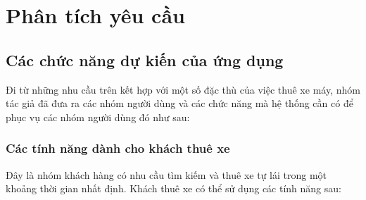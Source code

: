 \documentclass[../main.tex]{subfiles}
\begin{document}
	\chapter{Phân tích yêu cầu}
	\label{chap:requirements}

	\justifying


	\section{Các chức năng dự kiến của ứng dụng}

	Đi từ những nhu cầu trên kết hợp với một số đặc thù của việc thuê xe máy, nhóm tác giả đã đưa ra các nhóm người dùng
	và các chức năng mà hệ thống cần có để phục vụ các nhóm người dùng đó như sau:

	\subsection{Các tính năng dành cho khách thuê xe}

	Đây là nhóm khách hàng có nhu cầu tìm kiếm và thuê xe tự lái trong một khoảng thời gian nhất định. Khách thuê xe có
	thể sử dụng các tính năng sau:
\end{document}

